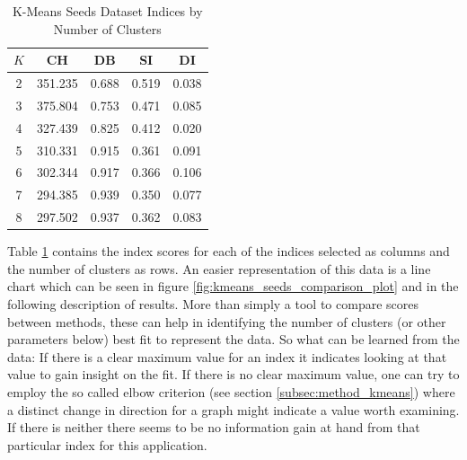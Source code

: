 \begin{table}[H]
\begin{center}
\begin{tabular}{crrrr}
$K$ & \multicolumn{1}{c}{\gls{CH}} & \multicolumn{1}{c}{\gls{DB}} & \multicolumn{1}{c}{\gls{SI}} & \multicolumn{1}{c}{\gls{DI}} \\ \hline
2 & 351.235 & 0.688 & 0.519 & 0.038 \\
3 & 375.804 & 0.753 & 0.471 & 0.085 \\
4 & 327.439 & 0.825 & 0.412 & 0.020 \\
5 & 310.331 & 0.915 & 0.361 & 0.091 \\
6 & 302.344 & 0.917 & 0.366 & 0.106 \\
7 & 294.385 & 0.939 & 0.350 & 0.077 \\
8 & 297.502 & 0.937 & 0.362 & 0.083 \\
\end{tabular}%
\end{center}
\caption{K-Means Seeds Dataset Indices by Number of Clusters}
\label{tab:kmeans_seeds_table}
\end{table}

Table \ref{tab:kmeans_seeds_table} contains the index scores for each of the indices selected as columns and the number of clusters as rows. An easier representation of this data is a line chart which can be seen in figure \ref{fig:kmeans_seeds_comparison_plot} and in the following description of results. More than simply a tool to compare scores between methods, these can help in identifying the number of clusters (or other parameters below) best fit to represent the data. So what can be learned from the data: If there is a clear maximum value for an index it indicates looking at that value to gain insight on the fit. If there is no clear maximum value, one can try to employ the so called elbow criterion (see section \ref{subsec:method_kmeans}) where a distinct change in direction for a graph might indicate a value worth examining. If there is neither there seems to be no information gain at hand from that particular index for this application.


